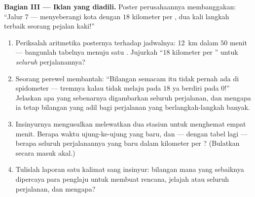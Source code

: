 \begin{problem}
\medskip\noindent\textbf{Bagian III --- Iklan yang diadili.}
Poster perusahaannya membanggakan: ``Jalur 7 --- menyeberangi kota
dengan $18$ kilometer per , dua kali langkah terbaik seorang
pejalan kaki!''
\begin{enumerate}[resume]
  \item Periksalah aritmetika posternya terhadap jadwalnya:
        \qty{12}{km} dalam $50$ menit --- bangunlah tabelnya menuju
        satu . Jujurkah ``$18$ kilometer per '' untuk
        \emph{seluruh} perjalanannya?
  \item Seorang perewel membantah: ``Bilangan semacam itu tidak
        pernah ada di spidometer --- tremnya kalau tidak melaju pada
        $18$ ya berdiri pada $0$!'' Jelaskan apa yang sebenarnya
        digambarkan  seluruh perjalanan, dan mengapa ia tetap
        bilangan yang adil bagi perjalanan yang berlangkah-langkah
        banyak.
  \item Insinyurnya mengusulkan melewatkan dua stasiun untuk
        menghemat empat menit. Berapa waktu ujung-ke-ujung yang baru,
        dan --- dengan tabel lagi --- berapa  seluruh
        perjalanannya yang baru dalam kilometer per ? (Bulatkan
        secara masuk akal.)
  \item Tulislah laporan satu kalimat sang insinyur: bilangan mana
        yang sebaiknya dipercaya para penglaju untuk membuat rencana,
         jelajah atau  seluruh perjalanan, dan
        mengapa?
\end{enumerate}
\end{problem}
